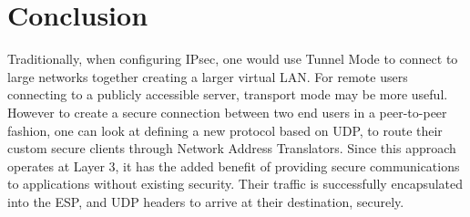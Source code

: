 \documentclass[conference,12pt]{IEEEtran}
\begin{document}
\section{Conclusion}
Traditionally, when configuring IPsec, one would use Tunnel Mode to connect to
large networks together creating a larger virtual LAN. For remote users
connecting to a publicly accessible server, transport mode may be more useful.
However to create a secure connection between two end users in a peer-to-peer
fashion, one can look at defining
a new protocol based on UDP, to route their custom secure clients through
Network Address Translators. Since this approach operates at Layer 3, it has the
added benefit of providing secure communications to applications without
existing security. Their traffic is successfully encapsulated into the ESP, and
UDP headers to arrive at their destination, securely.



\printbibliography
\end{document}
